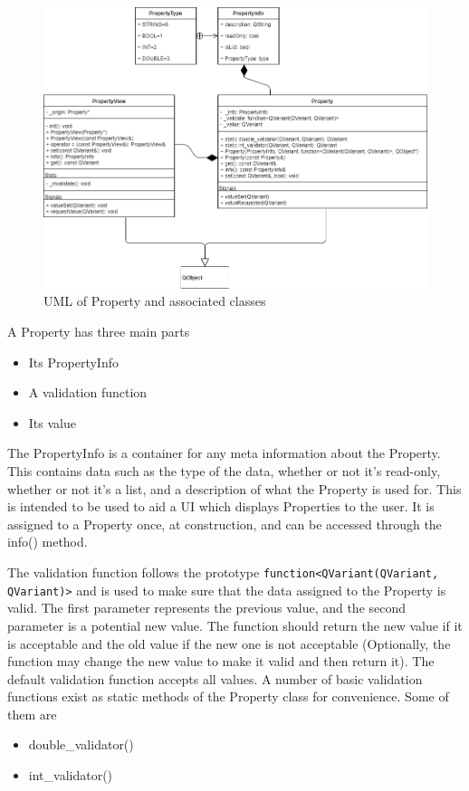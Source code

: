  \begin{figure}[h!]
 	\begin{center}
 	\includegraphics[width=\textwidth]{./images_design/uml/Property}
 	\caption{UML of Property and associated classes\label{uml:property}}
 	\end{center}
 \end{figure} 
 
 	A Property has three main parts
 	\begin{itemize}
 		\item Its PropertyInfo
 		\item A validation function
 		\item Its value
 	\end{itemize}
 	
 	The PropertyInfo is a container for any meta information about the Property. This contains data such as the type of the data, whether or not it's read-only, whether or not it's a list, and a description of what the Property is used for. This is intended to be used to aid a UI which displays Properties to the user. It is assigned to a Property once, at construction, and can be accessed through the info() method.
 	
 	The validation function follows the prototype \lstinline|function<QVariant(QVariant, QVariant)>| and is used to make sure that the data assigned to the Property is valid. The first parameter represents the previous value, and the second parameter is a potential new value. The function should return the new value if it is acceptable and the old value if the new one is not acceptable (Optionally, the function may change the new value to make it valid and then return it). The default validation function accepts all values. A number of basic validation functions exist as static methods of the Property class for convenience. Some of them are
 	\begin{itemize}
 		\item double\_validator()
 		\item int\_validator()
 	\end{itemize}
 	
